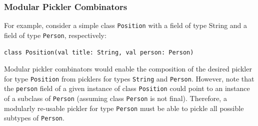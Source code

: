 \documentclass[preprint,10pt]{sigplanconf}
\theoremstyle{definition}
\theoremstyle{definition}
\newcommand{\term}[1]{\mbox{\texttt{#1}}}
\begin{document}

\subsubsection{Modular Pickler Combinators}





For example, consider a simple class \verb|Position| with a field of type
String and a field of type \term{Person}, respectively:

\begin{lstlisting}
class Position(val title: String, val person: Person)
\end{lstlisting}

Modular pickler combinators would enable the composition of the desired
pickler for type \term{Position} from picklers for types \term{String} and
\term{Person}. However, note that the \term{person} field of a given instance
of class \term{Position} could point to an instance of a subclass of
\term{Person} (assuming class \term{Person} is not final). Therefore, a
modularly re-usable pickler for type \term{Person} must be able to pickle all
possible subtypes of \term{Person}.
\end{document}

